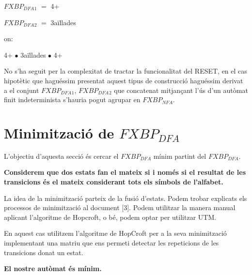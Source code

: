 \documentclass[12pt,a4paper]{report}
\def \dfa{$FXBP_{DFA} $}
\def \nfa{$FXBP_{NFA} $}
\begin{document}
\begin{center}
\dfa$_1$ $=$ 4+
\end{center}

\begin{center}
\dfa$_2$ $=$ 3aïllades
\end{center}

on:

\begin{center}
4+ $\bullet$ 3aïllades $\bullet$ 4+
\end{center}

No s’ha seguit per la complexitat de tractar la funcionalitat del RESET, en el cas hipotètic que haguéssim presentat aquest tipus de construcció haguéssim derivat a el conjunt {\dfa$_1$, \dfa$_2$} que concatenat mitjançant l'ús d'un autòmat finit indeterminista s'hauria pogut agrupar en \nfa{}.

\section{Minimització de \dfa{}}

L’objectiu d’aquesta secció és cercar el \dfa{} mínim partint del \dfa{}.

\textbf{Considerem que dos estats fan el mateix si i només si el resultat de les transicions és el mateix considerant tots els símbols de l’alfabet. }

La idea de la minimització parteix de la fusió d'estats. Podem trobar explicats els processos de minimització al document [3]. Podem utilitzar la manera manual aplicant l'algoritme de Hopcroft, o bé, podem optar per utilitzar UTM.

En aquest cas utilitzem l’algoritme de HopCroft per a la seva minimització implementant una matriu que ens permeti detectar les repeticions de les transicions donat un estat.


\begin{center}
\textbf{El nostre autòmat és mínim.}
\end{center}
\end{document}
